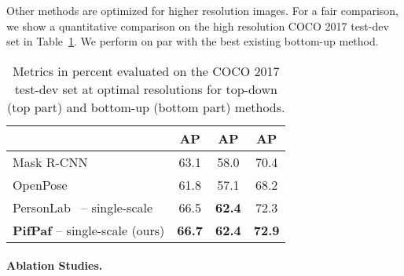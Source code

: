 \documentclass[10pt,twocolumn,letterpaper]{article}
\begin{document}
Other methods are optimized for higher resolution images. For a fair comparison,
we show a quantitative comparison on the high resolution COCO 2017 test-dev set
in Table~\ref{tab:high-res}. We perform on par with the best existing
bottom-up method.
\begin{table}
  \centering
  \begin{tabular}{|l|c c c|}


    \hline
                            & AP & AP & AP \\
    \hline\hline
    Mask R-CNN~\cite{he2017mask}            & 63.1 & 58.0 & 70.4 \\



    \hline
    OpenPose~\cite{partsaffinityfields}                 & 61.8 & 57.1 & 68.2 \\
    PersonLab~\cite{personlab} -- single-scale          & 66.5 & \textbf{62.4} & 72.3 \\



    \textbf{PifPaf} -- single-scale (ours)  & \textbf{66.7} & \textbf{62.4} & \textbf{72.9} \\
    \hline
  \end{tabular}
  \caption{
    Metrics in percent evaluated on the COCO 2017 test-dev set at optimal
    resolutions for top-down (top part) and bottom-up (bottom part) methods.
  }
  \label{tab:high-res}
\end{table}




\paragraph{Ablation Studies.}
\end{document}

